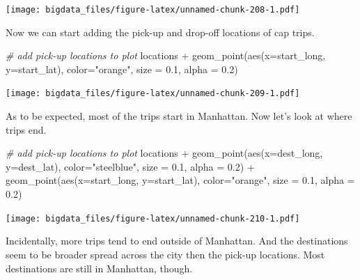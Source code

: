 \documentclass[
  12pt,
]{style/krantz}
\newenvironment{Shaded}{\begin{snugshade}}{\end{snugshade}}
\newcommand{\AttributeTok}[1]{\textcolor[rgb]{0.77,0.63,0.00}{#1}}
\newcommand{\CommentTok}[1]{\textcolor[rgb]{0.56,0.35,0.01}{\textit{#1}}}
\newcommand{\FloatTok}[1]{\textcolor[rgb]{0.00,0.00,0.81}{#1}}
\newcommand{\FunctionTok}[1]{\textcolor[rgb]{0.00,0.00,0.00}{#1}}
\newcommand{\NormalTok}[1]{#1}
\newcommand{\SpecialCharTok}[1]{\textcolor[rgb]{0.00,0.00,0.00}{#1}}
\newcommand{\StringTok}[1]{\textcolor[rgb]{0.31,0.60,0.02}{#1}}
\begin{document}
\texttt{[image: bigdata\_files/figure-latex/unnamed-chunk-208-1.pdf]}

Now we can start adding the pick-up and drop-off locations of cap trips.

\begin{Shaded}
\begin{Highlighting}[]
\CommentTok{\# add pick{-}up locations to plot}
\NormalTok{locations }\SpecialCharTok{+} 
     \FunctionTok{geom\_point}\NormalTok{(}\FunctionTok{aes}\NormalTok{(}\AttributeTok{x=}\NormalTok{start\_long, }\AttributeTok{y=}\NormalTok{start\_lat),}
                \AttributeTok{color=}\StringTok{"orange"}\NormalTok{,}
                \AttributeTok{size =} \FloatTok{0.1}\NormalTok{,}
                \AttributeTok{alpha =} \FloatTok{0.2}\NormalTok{)}
\end{Highlighting}
\end{Shaded}

\texttt{[image: bigdata\_files/figure-latex/unnamed-chunk-209-1.pdf]}

As to be expected, most of the trips start in Manhattan. Now let's look at where trips end.

\begin{Shaded}
\begin{Highlighting}[]
\CommentTok{\# add pick{-}up locations to plot}
\NormalTok{locations }\SpecialCharTok{+}
     \FunctionTok{geom\_point}\NormalTok{(}\FunctionTok{aes}\NormalTok{(}\AttributeTok{x=}\NormalTok{dest\_long, }\AttributeTok{y=}\NormalTok{dest\_lat),}
                \AttributeTok{color=}\StringTok{"steelblue"}\NormalTok{,}
                \AttributeTok{size =} \FloatTok{0.1}\NormalTok{,}
                \AttributeTok{alpha =} \FloatTok{0.2}\NormalTok{) }\SpecialCharTok{+}
     \FunctionTok{geom\_point}\NormalTok{(}\FunctionTok{aes}\NormalTok{(}\AttributeTok{x=}\NormalTok{start\_long, }\AttributeTok{y=}\NormalTok{start\_lat),}
                \AttributeTok{color=}\StringTok{"orange"}\NormalTok{,}
                \AttributeTok{size =} \FloatTok{0.1}\NormalTok{,}
                \AttributeTok{alpha =} \FloatTok{0.2}\NormalTok{)}
\end{Highlighting}
\end{Shaded}

\texttt{[image: bigdata\_files/figure-latex/unnamed-chunk-210-1.pdf]}

Incidentally, more trips tend to end outside of Manhattan. And the destinations seem to be broader spread across the city then the pick-up locations. Most destinations are still in Manhattan, though.
\end{document}

